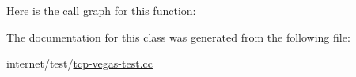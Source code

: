 Here is the call graph for this function\+:




The documentation for this class was generated from the following file\+:\begin{DoxyCompactItemize}
\item 
internet/test/\hyperlink{tcp-vegas-test_8cc}{tcp-\/vegas-\/test.\+cc}\end{DoxyCompactItemize}

